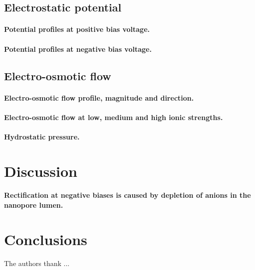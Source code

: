 \documentclass[journal=ancac3, manuscript=article, etalmode=truncate,maxauthors=0]{achemso}
\begin{document}
\subsection{Electrostatic potential}

\paragraph{Potential profiles at positive bias voltage.}
\paragraph{Potential profiles at negative bias voltage.}




\subsection{Electro-osmotic flow}



\paragraph{Electro-osmotic flow profile, magnitude and direction.}
\paragraph{Electro-osmotic flow at low, medium and high ionic strengths.}
\paragraph{Hydrostatic pressure.}



\section{Discussion}

\paragraph{Rectification at negative biases is caused by depletion of anions in the nanopore lumen.}

\section{Conclusions}

\begin{acknowledgement}
The authors thank ...
\end{acknowledgement}
\end{document}
